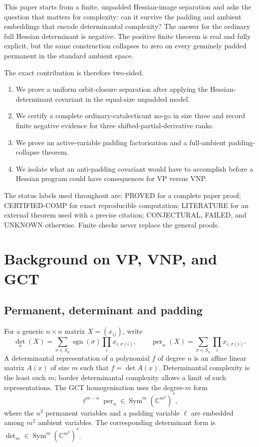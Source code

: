 \documentclass[11pt]{article}
\theoremstyle{definition}
\theoremstyle{remark}
\DeclareMathOperator{\per}{per}
\newcommand{\C}{\mathbb C}
\newcommand{\Sym}{\operatorname{Sym}}
\newcommand{\status}[1]{\textsf{#1}}
\begin{document}
This paper starts from a finite, unpadded Hessian-image separation and asks the
question that matters for complexity: can it survive the padding and ambient
embeddings that encode determinantal complexity?  The answer for the ordinary
full Hessian determinant is negative.  The positive finite theorem is real and
fully explicit, but the same construction collapses to zero on every genuinely
padded permanent in the standard ambient space.

The exact contribution is therefore two-sided.
\begin{enumerate}[leftmargin=2em]
\item We prove a uniform orbit-closure separation after applying the
Hessian-determinant covariant in the equal-size unpadded model.
\item We certify a complete ordinary-catalecticant no-go in size three and
record finite negative evidence for three shifted-partial-derivative ranks.
\item We prove an active-variable padding factorisation and a full-ambient
padding-collapse theorem.
\item We isolate what an anti-padding covariant would have to accomplish before
a Hessian program could have consequences for VP versus VNP.
\end{enumerate}

The status labels used throughout are:
\status{PROVED} for a complete paper proof;
\status{CERTIFIED-COMP} for exact reproducible computation;
\status{LITERATURE} for an external theorem used with a precise citation;
\status{CONJECTURAL}, \status{FAILED}, and \status{UNKNOWN} otherwise.
Finite checks never replace the general proofs.

\section{Background on VP, VNP, and GCT}

\subsection{Permanent, determinant and padding}

For a generic $n\times n$ matrix $X=(x_{ij})$, write
\[
\det_n(X)=\sum_{\sigma\in S_n}\operatorname{sgn}(\sigma)
 \prod_i x_{i,\sigma(i)},\qquad
\per_n(X)=\sum_{\sigma\in S_n}\prod_i x_{i,\sigma(i)}.
\]
A determinantal representation of a polynomial $f$ of degree $n$ is an affine
linear matrix $A(x)$ of size $m$ such that $f=\det A(x)$.  Determinantal
complexity is the least such $m$; border determinantal complexity allows a
limit of such representations.  The GCT homogenisation uses the degree-$m$
form
\[
\ell^{m-n}\per_n\in\Sym^m(\C^{m^2})^*,
\]
where the $n^2$ permanent variables and a padding variable $\ell$ are embedded
among $m^2$ ambient variables.  The corresponding determinant form is
$\det_m\in\Sym^m(\C^{m^2})^*$.
\end{document}

